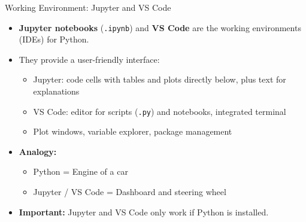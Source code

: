 \documentclass[aspectratio=169,11pt]{beamer}
\begin{document}
\begin{frame}{Working Environment: Jupyter and VS Code}
\begin{itemize}
    \item \textbf{Jupyter notebooks} (\texttt{.ipynb}) and \textbf{VS Code}
          are the working environments (IDEs) for Python.

    \vspace{0.3cm}

    \item They provide a user-friendly interface:
    \begin{itemize}
        \item Jupyter: code cells with tables and plots directly below,
              plus text for explanations
        \item VS Code: editor for scripts (\texttt{.py}) and notebooks,
              integrated terminal
        \item Plot windows, variable explorer, package management
    \end{itemize}

    \vspace{0.3cm}

    \item \textbf{Analogy:}
    \begin{itemize}
        \item Python = Engine of a car
        \item Jupyter / VS Code = Dashboard and steering wheel
    \end{itemize}

    \vspace{0.3cm}

    \item \textbf{Important:} Jupyter and VS Code only work if Python is installed.
\end{itemize}
\end{frame}
\end{document}
